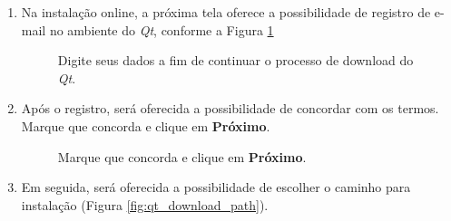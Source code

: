\documentclass[a4paper,11pt]{article}
\newcommand{\qt}{\textit{Qt}}
\begin{document}
\begin{enumerate}
\item Na instalação online, a próxima tela oferece a possibilidade de registro de e-mail no ambiente do \qt, conforme a Figura \ref{fig:qt_installer_email}

\begin{figure}[H]
	\centering
	\caption{Digite seus dados a fim de continuar o processo de download do \qt{}.}
	\label{fig:qt_installer_email}
\end{figure}

\item Após o registro, será oferecida a possibilidade de concordar com os termos. Marque que concorda e clique em \textbf{Próximo}.

\begin{figure}[H]
	\centering
	\caption{ Marque que concorda e clique em \textbf{Próximo}.}
	\label{fig:qt_after_email}
\end{figure}

\item Em seguida, será oferecida a possibilidade de escolher o caminho  para instalação (Figura \ref{fig:qt_download_path}).


\end{enumerate}
\end{document}
